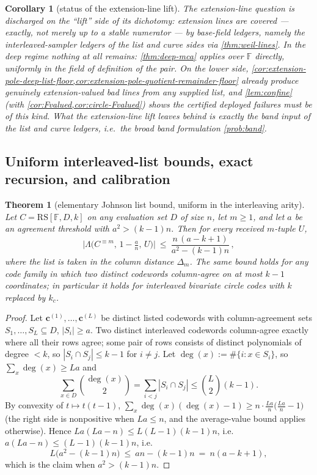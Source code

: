 \documentclass[11pt]{article}
\newtheorem{theorem}{Theorem}[section]
\newtheorem{corollary}[corollary]{Corollary}
\theoremstyle{definition}
\theoremstyle{remark}
\newcommand{\F}{\mathbb{F}}
\newcommand{\RS}{\mathrm{RS}}
\newcommand{\dist}{\Delta}
\newcommand{\Lst}{\Lambda}
\begin{document}
\begin{corollary}[status of the extension-line lift]\label{cor:T3-status}
The extension-line question is discharged on the ``lift'' side of its dichotomy: extension lines are covered --- exactly, not merely up to a stable numerator --- by base-field ledgers, namely the interleaved-sampler ledgers of the list and curve sides via \cref{thm:weil-lines}. In the deep regime nothing at all remains: \cref{thm:deep-mca} applies over $\F$ directly, uniformly in the field of definition of the pair. On the lower side, \cref{cor:extension-pole-deep-list-floor,cor:extension-pole-quotient-remainder-floor} already produce genuinely extension-valued bad lines from any supplied list, and \cref{lem:confine} \textup(with \cref{cor:Fvalued,cor:circle-Fvalued}\textup) shows the certified deployed failures must be of this kind. What the extension-line lift leaves behind is exactly the band input of the list and curve ledgers, i.e.\ the broad band formulation \cref{prob:band}.
\end{corollary}
\subsection{Uniform interleaved-list bounds, exact recursion, and calibration}\label{sec:discharge-T4}

\begin{theorem}[elementary Johnson list bound, uniform in the interleaving arity]\label{thm:johnson-list}
Let $C=\RS[\F,D,k]$ on any evaluation set $D$ of size $n$, let $m\ge1$, and let $a$ be an agreement threshold with $a^2>(k-1)n$. Then for every received $m$-tuple $U$,
\[
\bigl|\Lst\bigl(C^{\equiv m},\,1-\tfrac an,\,U\bigr)\bigr|
\ \le\
\frac{n\,(a-k+1)}{a^2-(k-1)n}\,,
\]
where the list is taken in the column distance $\dist_m$. The same bound holds for any code family in which two distinct codewords column-agree on at most $k-1$ coordinates; in particular it holds for interleaved bivariate circle codes with $k$ replaced by $k_c$.
\end{theorem}

\begin{proof}
Let $\mathbf c^{(1)},\dots,\mathbf c^{(L)}$ be distinct listed codewords with column-agreement sets $S_1,\dots,S_L\subseteq D$, $|S_i|\ge a$. Two distinct interleaved codewords column-agree exactly where all their rows agree; some pair of rows consists of distinct polynomials of degree $<k$, so $|S_i\cap S_j|\le k-1$ for $i\ne j$. Let $\deg(x):=\#\{i:x\in S_i\}$, so $\sum_x\deg(x)\ge La$ and
\[
\sum_{x\in D}\binom{\deg(x)}2=\sum_{i<j}|S_i\cap S_j|\le\binom L2(k-1).
\]
By convexity of $t\mapsto t(t-1)$, $\sum_x\deg(x)(\deg(x)-1)\ge n\cdot\frac{La}n\bigl(\frac{La}n-1\bigr)$ \textup(the right side is nonpositive when $La\le n$, and the average-value bound applies otherwise\textup). Hence $La(La-n)\le L(L-1)(k-1)n$, i.e.\ $a(La-n)\le(L-1)(k-1)n$, i.e.
\[
L\bigl(a^2-(k-1)n\bigr)\ \le\ an-(k-1)n\ =\ n(a-k+1),
\]
which is the claim when $a^2>(k-1)n$.
\end{proof}
\end{document}
